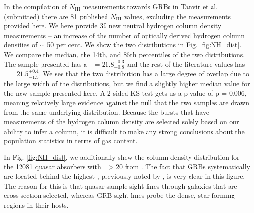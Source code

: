 \documentclass{aa}    %
\begin{document}
In the compilation of $N_{\mathrm{HI}}$ measurements towards GRBs in Tanvir et
al. (submitted) %
there are 81 published $N_{\mathrm{HI}}$ values, excluding the measurements
provided here. We here provide 39 new neutral hydrogen column density
measurements -- an increase of the number of optically derived hydrogen column
densities of $\sim$ 50 per cent. We show the two distributions in  Fig.
\ref{fig:NH_dist}. We compare the median, the 14th, and 86th percentiles of the
two distributions. The sample presented has a \nh~$= 21.8_{-0.8}^{+0.3}$ and the
rest of the literature values has \nh~$= 21.5_{-1.5}^{+0.4}$. We see that the
two distribution has a large degree of overlap due to the large width of the
distributions, but we find a slightly higher median value for the new sample
presented here. A 2-sided KS test gets us a p-value of p = 0.006, meaning
relatively large evidence against the null that the two samples are drawn from
the same underlying distribution. Because the bursts that have measurements of
the hydrogen column density are selected solely based on our ability to infer a
column, it is difficult to make any strong conclusions about the population
statistics in terms of gas content.

In Fig. \ref{fig:NH_dist}, we additionally show the column density-distribution
for the 12081 quasar absorbers with \nh~$> 20$ from \citet{Noterdaeme2012b}. The
fact that GRBs systematically are located behind the highest \nh, previously
noted by \citep[e.g.,][]{Prochaska2007, Fynbo2009}, is very clear in this
figure. The reason for this is that quasar sample sight-lines through galaxies
that are cross-section selected, whereas GRB sight-lines probe the dense,
star-forming regions in their hosts.
\end{document}
